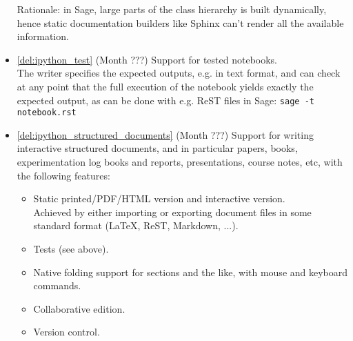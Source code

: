 \begin{Workpackage}{\thewpno}
\begin{WPDeliverables}
\begin{itemize}
    Rationale: in Sage, large parts of the class hierarchy is built
    dynamically, hence static documentation builders like Sphinx can't
    render all the available information.
  \item \ref{del:ipython_test} (Month ???) Support for tested
    notebooks.\\
    The writer specifies the expected outputs, e.g. in text format,
    and can check at any point that the full execution of the notebook
    yields exactly the expected output, as can be done with e.g. ReST
    files in Sage: \lstinline{sage -t notebook.rst}
  \item \ref{del:ipython_structured_documents} (Month ???) Support for writing
    interactive structured documents, and in particular papers, books,
    experimentation log books and reports, presentations, course
    notes, etc, with the following features:
    \begin{itemize}
    \item Static printed/PDF/HTML version and interactive version.\\
      Achieved by either importing or exporting document files in some
      standard format (LaTeX, ReST, Markdown, ...).
    \item Tests (see above).
    \item Native folding support for sections and the like, with mouse
      and keyboard commands.
    \item Collaborative edition.
    \item Version control.
    \end{itemize}
  \end{itemize}
\end{WPDeliverables}
\end{Workpackage}
